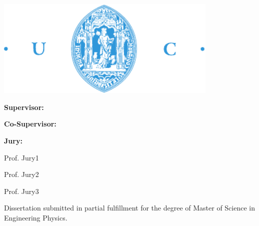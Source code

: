 \begin{titlepage}
\begin{center}
\includegraphics[width=0.8\textwidth]{images/fctuc.pdf}

\vspace{1cm}
{\huge{\textbf{\thesistitle}}\par}

\vspace{1cm}
{\large{\textbf{Supervisor:}\\\supervisorname\par}}
\vspace{5mm}
{\large{\textbf{Co-Supervisor:}\\\cosupervisorname}}

\vspace{1cm}
{\large{\textbf{Jury:}

Prof. Jury1

Prof. Jury2

Prof. Jury3

}}

\vfill
Dissertation submitted in partial fulfillment for the degree of Master of Science in Engineering Physics.

\vspace{0.5cm}
{\large \statedate\par}    


\end{center}
\end{titlepage}